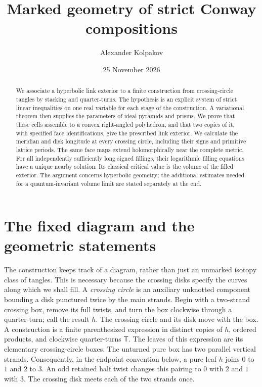 \documentclass[11pt]{article}
\title{Marked geometry of strict Conway compositions}
\author{Alexander Kolpakov}\date{25 November 2026}
\numberwithin{equation}{section}
\theoremstyle{definition}\newtheorem{definition}[theorem]{Definition}
\theoremstyle{remark}\newtheorem{remark}[theorem]{Remark}
\newcommand{\Turn}{\mathsf T}
\begin{document}
\maketitle
\begin{abstract}
We associate a hyperbolic link exterior to a finite construction from
crossing-circle tangles by stacking and quarter-turns. The hypothesis is
an explicit system of strict linear inequalities on one real variable
for each stage of the construction. A variational theorem then supplies
the parameters of ideal pyramids and prisms. We prove that these cells
assemble to a convex right-angled polyhedron, and that two copies of it,
with specified face identifications, give the prescribed link exterior.
We calculate the meridian and disk longitude at every crossing circle,
including their signs and primitive lattice periods. The same face maps
extend holomorphically near the complete metric. For all independently
sufficiently long signed fillings, their logarithmic filling equations
have a unique nearby solution. Its classical critical value is the
volume of the filled exterior. The argument concerns hyperbolic geometry;
the additional estimates needed for a quantum-invariant volume limit
are stated separately at the end.
\end{abstract}

\section{The fixed diagram and the geometric statements}\label{sm:intro}

The construction keeps track of a diagram, rather than just an unmarked
isotopy class of tangles. This is necessary because the crossing disks
specify the curves along which we shall fill. A \emph{crossing circle} is
an auxiliary unknotted component bounding a disk punctured twice by the
main strands. Begin with a two-strand crossing box, remove its full
twists, and turn the box clockwise through a quarter-turn; call the
result $h$. The crossing circle and its disk move with the box.
A construction is a finite parenthesized expression in distinct copies
of $h$, ordered products, and clockwise quarter-turns $\Turn$.
The leaves of this expression are its elementary crossing-circle boxes.
The unturned pure box has two parallel vertical strands. Consequently,
in the endpoint convention below, a pure leaf $h$ joins $0$ to $1$
and $2$ to $3$. An odd retained half twist changes this pairing to
$0$ with $2$ and $1$ with $3$. The crossing disk meets each of the
two strands once.
\end{document}
